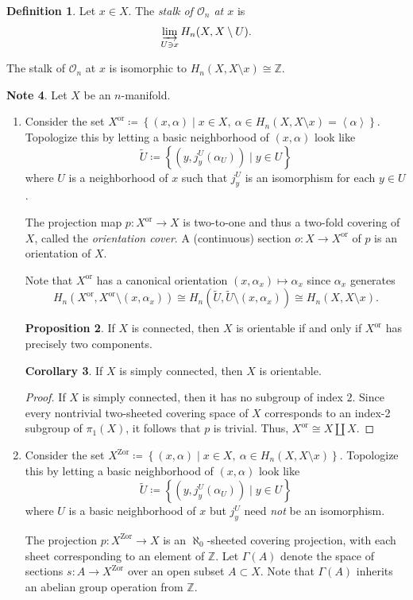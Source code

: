 \documentclass[10pt,letterpaper,cm]{nupset}
\theoremstyle{definition}
\newtheorem{definition}{Definition}[subsection]
\newtheorem{note}[definition]{Note}
\theoremstyle{theorem}
\newtheorem{prop}[definition]{Proposition}
\newtheorem{corollary}[definition]{Corollary}
\theoremstyle{remark}
\newcommand{\Z}{\mathbb Z}
\newcommand{\1}{\mathbb{1}}
\newcommand{\0}{\vec 0}
\begin{document}
\begin{definition}
Let $x\in X$. The \textit{stalk of $\mathcal{O}_n$ at $x$} is  $$\varinjlim_{U\ni x} H_n(X, X \setminus U).$$
\end{definition}


The stalk of $\mathcal{O}_n$ at $x$ is isomorphic to $H_n(X, X \setminus x) \cong \Z$.


\begin{note}
Let $X$ be an $n$-manifold.
\begin{enumerate}
\item Consider the set $X^{\mathrm{or}} \coloneqq  \left\{(x, \alpha) \mid x\in X, \ \alpha \in H_n(X, X \setminus x) =\left\langle \alpha \right\rangle \right\}$. Topologize this by letting a basic neighborhood of $\left(x, \alpha\right)$ look like $$\widetilde{U}\coloneqq  \left\{(y, j_y^U(\alpha_U)) \mid y \in U\right\}$$ where $U$ is a neighborhood of $x$ such that $j_y^U$ is an isomorphism for each $y\in U$.

The projection map $p: X^{\mathrm{or}} \to X$ is two-to-one and thus a two-fold covering of $X$, called the \textit{orientation cover}. A (continuous) section $o: X \to X^{\mathrm{or}}$ of $p$ is an orientation of $X$.

Note that $X^{\mathrm{or}}$ has a canonical orientation $\left(x, \alpha_x\right) \mapsto \alpha_x$ since $\alpha_x$ generates $$H_n(X^{\mathrm{or}}, X^{\mathrm{or}} \setminus (x, \alpha_x)) \cong H_n\left(\widetilde{U}, \widetilde{U} \setminus (x, \alpha_x)\right) \cong H_n(X, X \setminus x).$$
\begin{prop}
If $X$ is connected, then $X$ is orientable if and only if $X^{\mathrm{or}}$ has precisely two components. 
\end{prop}
\begin{corollary}
If $X$ is simply connected, then $X$ is orientable. 
\end{corollary}
\begin{proof}
If $X$ is simply connected, then it has no subgroup of index $2$. Since every nontrivial two-sheeted covering space of $X$ corresponds to an index-2 subgroup of $\pi_1(X)$, it follows that $p$ is trivial. Thus, $X^{\mathrm{or}} \cong X \coprod X$. 
\end{proof}
\item Consider the set $X^{\mathrm{Zor}} \coloneqq  \left\{\left(x, \alpha\right) \mid x\in X, \ \alpha \in H_n(X, X \setminus x) \right\}$. Topologize this by letting a basic neighborhood of $\left(x, \alpha\right)$ look like $$\widetilde{U}\coloneqq  \left\{ \left(y, j_y^U(\alpha_U)\right) \mid y \in U\right\}$$ where $U$ is a basic neighborhood of $x$ but $j_y^U$ need \emph{not} be an isomorphism. 

The projection $p: X^{\mathrm{Zor}} \to X$ is an $\aleph_0$-sheeted covering projection, with each sheet corresponding to an element of $\Z$. Let  $\Gamma(A)$ denote the space of sections $s: A \to X^{\mathrm{Zor}}$ over an open subset $A\subset X$. Note that $\Gamma(A)$ inherits an abelian group operation from $\Z$. 
\end{enumerate}
\end{note}
\end{document}
